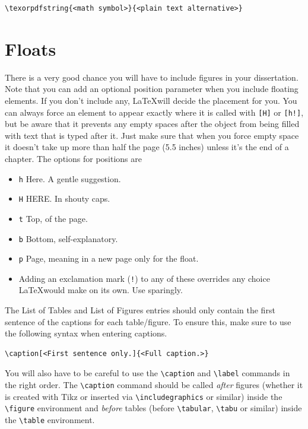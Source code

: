 \begin{lstlisting}
\texorpdfstring{<math symbol>}{<plain text alternative>}
\end{lstlisting}

\section{Floats}
There is a very good chance you will have to include figures in your dissertation. Note that you can add an optional position parameter when you include floating elements. If you don't include any, \LaTeX will decide the placement for you. You can always force an element to appear exactly where it is called with \texttt{[H]} or \texttt{[h!]}, but be aware that it prevents any empty spaces after the object from being filled with text that is typed after it. Just make sure that when you force empty space it doesn't take up more than half the page (5.5 inches) unless it's the end of a chapter. The options for positions are 
\begin{itemize}
\item \texttt{h} Here. A gentle suggestion.
\item \texttt{H} HERE. In shouty caps.
\item \texttt{t} Top, of the page.
\item \texttt{b} Bottom, self-explanatory.
\item \texttt{p} Page, meaning in a new page only for the float.
\item Adding an exclamation mark (\texttt{!}) to any of these overrides any choice \LaTeX would make on its own. Use sparingly.
\end{itemize}

The List of Tables and List of Figures entries should only contain the first sentence of the captions for each table/figure. To ensure this, make sure to use the following syntax when entering captions.
\begin{lstlisting}
\caption[<First sentence only.]{<Full caption.>}
\end{lstlisting}

\begin{sloppypar}
You will also have to be careful to use the \verb|\caption| and \verb|\label| commands in the right order. The \verb|\caption| command should be called \textit{after} figures (whether it is created with Tikz or inserted via \verb|\includegraphics| or similar) inside the \verb|\figure| environment and \textit{before} tables (before \verb|\tabular|, \verb|\tabu| or similar) inside the \verb|\table| environment.
\end{sloppypar}

